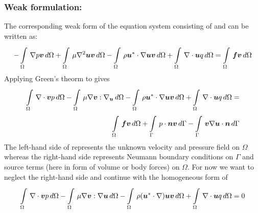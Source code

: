 \subsubsection{Weak formulation:}

The corresponding weak form of the equation system consisting of
 and  can be written
as:
\begin{equation}
  -\gint{\Omega}{}{\gradient{}{p}\vectr{v}}{\Omega}
  +\gint{\Omega}{}{\mu\laplacian{}{\vectr{u}}\vectr{v}}{\Omega}
  -\gint{\Omega}{}{\rho\dotprod{\vectr{u}^*}{\gradient{}{\vectr{u}}}\vectr{v} }{\Omega}
  +\gint{\Omega}{}{\divergence{}{\vectr{u}}q}{\Omega}=
  \gint{\Omega}{}{\vectr{f}\vectr{v}}{\Omega}  
  \label{eqn:Stokesweakform}
\end{equation}
Applying Green's theorm to  gives
\begin{equation}
  \begin{split}
  \gint{\Omega}{}{\divergence{}{\vectr{v}}p}{\Omega}
  -\gint{\Omega}{}{\mu\doubledotprod{\gradient{}{\vectr{v}}}{\gradient{\vectr{u}}}}{\Omega}
  -\gint{\Omega}{}{\rho\dotprod{\vectr{u}^*}{\gradient{}{\vectr{u}}}\vectr{v}}{\Omega}
  +\gint{\Omega}{}{\divergence{}{\vectr{u}}q}{\Omega}=\\
  \gint{\Omega}{}{\vectr{f}\vectr{v}}{\Omega}  
  +\gint{\Gamma}{}{\dotprod{p}{\vectr{n}\vectr{v}}}{\Gamma}
  -\gint{\Gamma}{}{\dotprod{\vectr{v}\gradient{}{\vectr{u}}}{\vectr{n}}}{\Gamma}
  \end{split}
  \label{eqn:Stokesweakform2}
\end{equation}
The left-hand side of  represents the unknown
velocity and pressure field on $\Omega$ whereas the right-hand side represents
Neumann boundary conditions on $\Gamma$ and source terms (here in form of
volume or body forces) on $\Omega$. For now we want to neglect the right-hand
side and continue with the homogeneous form of 
\begin{equation}
  \begin{split}
  \gint{\Omega}{}{\grad\cdot\vectr{v}p}{\Omega}
  -\gint{\Omega}{}{\mu\grad\vectr{v}:\grad\vectr{u}}{\Omega}
  -\gint{\Omega}{}{\rho(\vectr{u}^*\cdot\grad)\vectr{u}\vectr{v}}{\Omega}
  +\gint{\Omega}{}{\grad\cdot \vectr{u}q}{\Omega}=0
  \end{split}
  \label{eqn:Stokesweakform3}
\end{equation}

